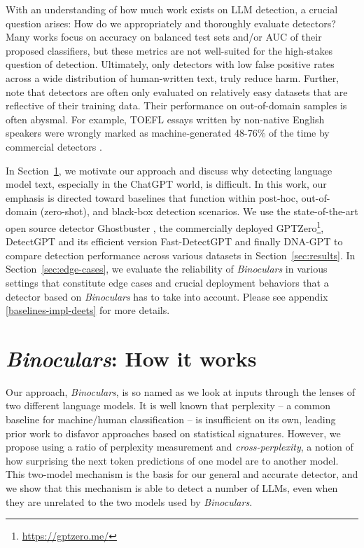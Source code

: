 \documentclass{article} %
\begin{document}
With an understanding of how much work exists on LLM detection, a crucial question arises: How do we appropriately and thoroughly evaluate detectors? 
Many works focus on accuracy on balanced test sets and/or AUC of their proposed classifiers, but these metrics are not well-suited for the high-stakes question of detection. 
Ultimately, only detectors with low false positive rates across a wide distribution of human-written text, truly reduce harm. 
Further, \citet{liang_gpt_2023} note that detectors are often only evaluated on relatively easy datasets that are reflective of their training data. 
Their performance on out-of-domain samples is often abysmal.
For example, TOEFL essays written by non-native English speakers were wrongly marked as machine-generated 48-76\% of the time by commercial detectors \citep{liang_gpt_2023}.

In Section~\ref{sec:methods}, we motivate our approach and discuss why detecting language model text, especially in the ChatGPT world, is difficult.
In this work, our emphasis is directed toward baselines that function within post-hoc, out-of-domain (zero-shot), and black-box detection scenarios. We use the state-of-the-art open source detector Ghostbuster \citep{verma_ghostbuster_2023}, the commercially deployed GPTZero\footnote{\href{https://gptzero.me/}{https://gptzero.me/}}, DetectGPT \citep{mitchell_detectgpt_2023} and its efficient version Fast-DetectGPT \citep{fastdetectgpt} and finally DNA-GPT \citep{dnagpt2023} to compare detection performance across various datasets in Section~\ref{sec:results}. In Section~\ref{sec:edge-cases}, we evaluate the reliability of \emph{Binoculars} in various settings that constitute edge cases and crucial deployment behaviors that a detector based on \emph{Binoculars} has to take into account. Please see appendix \ref{baselines-impl-deets} for more details.

\section{\emph{Binoculars}: How it works}
\label{sec:methods}

Our approach, \emph{Binoculars}, is so named as we look at inputs through the lenses of two different language models.
It is well known that perplexity -- a common baseline for machine/human classification -- is insufficient on its own, leading prior work to disfavor approaches based on statistical signatures. 
However, we propose using a ratio of perplexity measurement and \textit{cross-perplexity}, a notion of how surprising the next token predictions of one model are to another model. 
This two-model mechanism is the basis for our general and accurate detector, and we show that this mechanism is able to detect a number of LLMs, even when they are unrelated to the two models used by \emph{Binoculars}.
\end{document}
